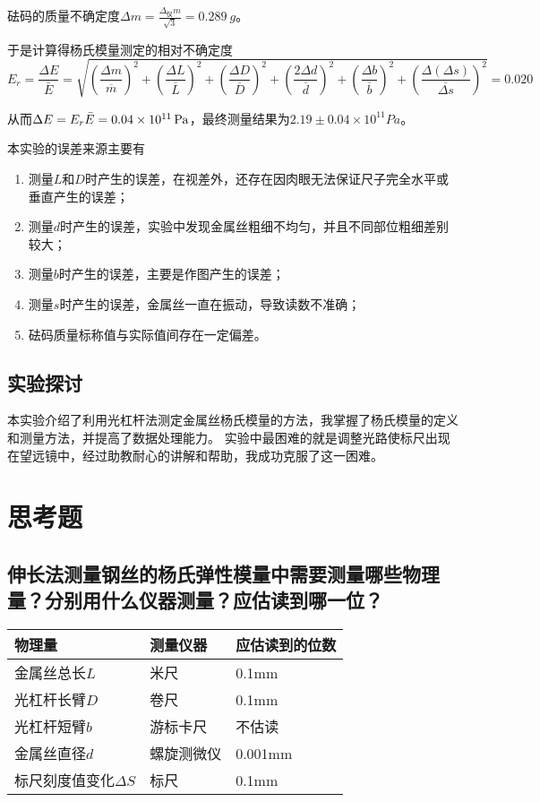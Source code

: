\documentclass[]{../template/Report}%
\begin{document}
\begin{fullreportonly}
砝码的质量不确定度$\Delta m = \frac{\Delta_\text{仪} m}{\sqrt{3}} = \SI{0.289}{g}$。

于是计算得杨氏模量测定的相对不确定度
\[E_r = \frac{\Delta E}{\bar{E}} = \sqrt{\left(\frac{\Delta m}{\overline{m}}\right)^2 +\left(\frac{\Delta L}{\overline{L}}\right)^2 + \left(\frac{\Delta D}{\overline{D}}\right)^2 + \left(\frac{2\Delta d}{\overline{d}}\right)^2 + \left(\frac{\Delta b}{\overline{b}}\right)^2 + \left(\frac{\Delta \left(\Delta s\right)}{\overline{\Delta s}}\right)^2}
=0.020\]

从而$\Delta E = E_r \bar{E} = \SI{0.04E11}{Pa}$，最终测量结果为$2.19 \pm 0.04 \times 10^{11} \si{Pa}$。

本实验的误差来源主要有
\begin{enumerate}
    \item 测量$L$和$D$时产生的误差，在视差外，还存在因肉眼无法保证尺子完全水平或垂直产生的误差；
    \item 测量$d$时产生的误差，实验中发现金属丝粗细不均匀，并且不同部位粗细差别较大；
    \item 测量$b$时产生的误差，主要是作图产生的误差；
    \item 测量$s$时产生的误差，金属丝一直在振动，导致读数不准确；
    \item 砝码质量标称值与实际值间存在一定偏差。
\end{enumerate}

\subsection{实验探讨}
本实验介绍了利用光杠杆法测定金属丝杨氏模量的方法，我掌握了杨氏模量的定义和测量方法，并提高了数据处理能力。
实验中最困难的就是调整光路使标尺出现在望远镜中，经过助教耐心的讲解和帮助，我成功克服了这一困难。

\section{思考题}

\subsection{伸长法测量钢丝的杨氏弹性模量中需要测量哪些物理量？分别用什么仪器测量？应估读到哪一位？}
\begin{table}[H]
	\centering
	\begin{tabular}{C{.2\textwidth}C{.2\textwidth}C{.2\textwidth}}
		\toprule
		物理量 & 测量仪器 & 应估读到的位数 \\
		\midrule
		金属丝总长$L$ & 米尺 & 0.1mm \\
		光杠杆长臂$D$ & 卷尺 & 0.1mm \\
		光杠杆短臂$b$ & 游标卡尺 & 不估读 \\
		金属丝直径$d$ & 螺旋测微仪 & 0.001mm \\
		标尺刻度值变化$\Delta S$ & 标尺 & 0.1mm \\
		\bottomrule
	\end{tabular}
\end{table}



\end{fullreportonly}
\end{document}
